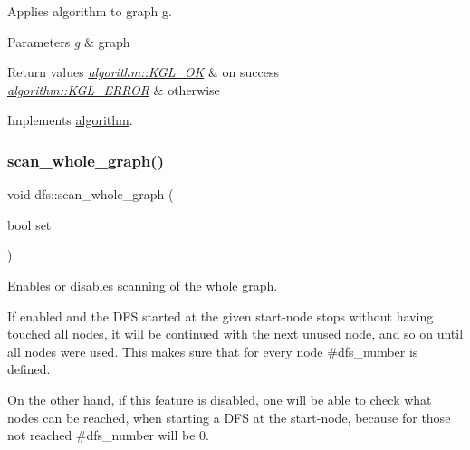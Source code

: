 Applies algorithm to graph g. 


\begin{DoxyParams}{Parameters}
{\em g} & graph \\
\hline
\end{DoxyParams}

\begin{DoxyRetVals}{Return values}
{\em \mbox{\hyperlink{classalgorithm_af1a0078e153aa99c24f9bdf0d97f6710aae4c1cd7fe8d8cf4b143241a6e7c31cf}{algorithm\+::\+K\+G\+L\+\_\+\+OK}}} & on success \\
\hline
{\em \mbox{\hyperlink{classalgorithm_af1a0078e153aa99c24f9bdf0d97f6710ae67bf27b2ef31f73e545a7f9f4a69556}{algorithm\+::\+K\+G\+L\+\_\+\+E\+R\+R\+OR}}} & otherwise \\
\hline
\end{DoxyRetVals}


Implements \mbox{\hyperlink{classalgorithm_a482eb28cacba018b5a86d3a819a50a2f}{algorithm}}.

\mbox{\label{classdfs_aa7c864a6f3a120720138b187b3ed95b5}} 
\subsubsection{\texorpdfstring{scan\+\_\+whole\+\_\+graph()}{scan\_whole\_graph()}\hspace{0.1cm}{\footnotesize\ttfamily [1/2]}}
{\footnotesize\ttfamily void dfs\+::scan\+\_\+whole\+\_\+graph (\begin{DoxyParamCaption}\item[{bool}]{set }\end{DoxyParamCaption})\hspace{0.3cm}{\ttfamily [inline]}}



Enables or disables scanning of the whole graph. 

If enabled and the D\+FS started at the given start-\/node stops without having touched all nodes, it will be continued with the next unused node, and so on until all nodes were used. This makes sure that for every node \#dfs\+\_\+number is defined.

On the other hand, if this feature is disabled, one will be able to check what nodes can be reached, when starting a D\+FS at the start-\/node, because for those not reached \#dfs\+\_\+number will be 0.


